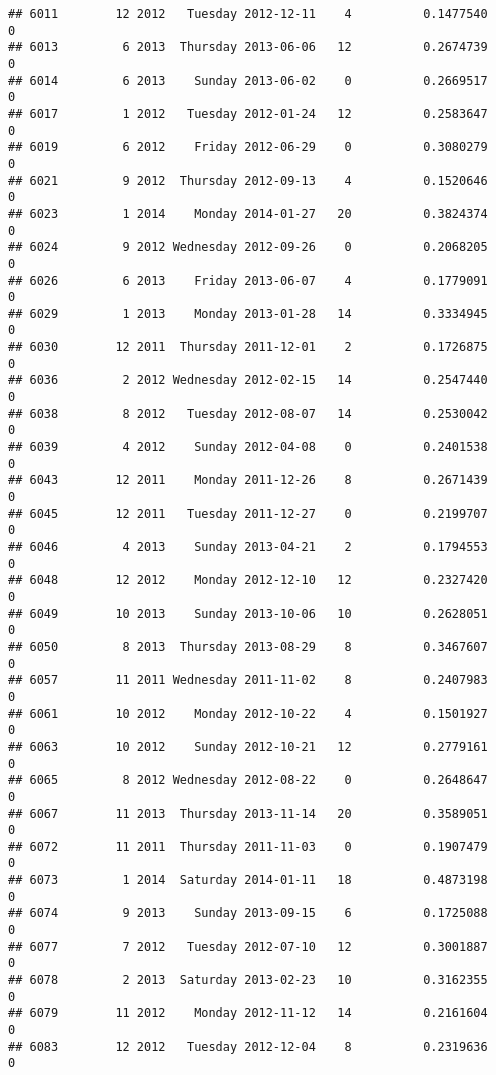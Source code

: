 \documentclass[
]{article}
\begin{document}
\begin{verbatim}
## 6011        12 2012   Tuesday 2012-12-11    4          0.1477540             0
## 6013         6 2013  Thursday 2013-06-06   12          0.2674739             0
## 6014         6 2013    Sunday 2013-06-02    0          0.2669517             0
## 6017         1 2012   Tuesday 2012-01-24   12          0.2583647             0
## 6019         6 2012    Friday 2012-06-29    0          0.3080279             0
## 6021         9 2012  Thursday 2012-09-13    4          0.1520646             0
## 6023         1 2014    Monday 2014-01-27   20          0.3824374             0
## 6024         9 2012 Wednesday 2012-09-26    0          0.2068205             0
## 6026         6 2013    Friday 2013-06-07    4          0.1779091             0
## 6029         1 2013    Monday 2013-01-28   14          0.3334945             0
## 6030        12 2011  Thursday 2011-12-01    2          0.1726875             0
## 6036         2 2012 Wednesday 2012-02-15   14          0.2547440             0
## 6038         8 2012   Tuesday 2012-08-07   14          0.2530042             0
## 6039         4 2012    Sunday 2012-04-08    0          0.2401538             0
## 6043        12 2011    Monday 2011-12-26    8          0.2671439             0
## 6045        12 2011   Tuesday 2011-12-27    0          0.2199707             0
## 6046         4 2013    Sunday 2013-04-21    2          0.1794553             0
## 6048        12 2012    Monday 2012-12-10   12          0.2327420             0
## 6049        10 2013    Sunday 2013-10-06   10          0.2628051             0
## 6050         8 2013  Thursday 2013-08-29    8          0.3467607             0
## 6057        11 2011 Wednesday 2011-11-02    8          0.2407983             0
## 6061        10 2012    Monday 2012-10-22    4          0.1501927             0
## 6063        10 2012    Sunday 2012-10-21   12          0.2779161             0
## 6065         8 2012 Wednesday 2012-08-22    0          0.2648647             0
## 6067        11 2013  Thursday 2013-11-14   20          0.3589051             0
## 6072        11 2011  Thursday 2011-11-03    0          0.1907479             0
## 6073         1 2014  Saturday 2014-01-11   18          0.4873198             0
## 6074         9 2013    Sunday 2013-09-15    6          0.1725088             0
## 6077         7 2012   Tuesday 2012-07-10   12          0.3001887             0
## 6078         2 2013  Saturday 2013-02-23   10          0.3162355             0
## 6079        11 2012    Monday 2012-11-12   14          0.2161604             0
## 6083        12 2012   Tuesday 2012-12-04    8          0.2319636             0

\end{verbatim}
\end{document}
